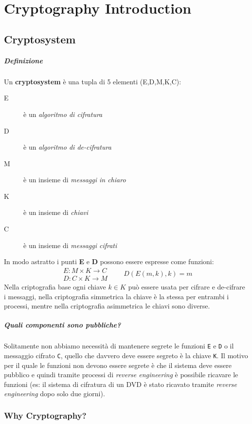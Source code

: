 \chapter{Cryptography Introduction}
\section{Cryptosystem}
    \paragraph{Definizione} Un \textbf{cryptosystem} è una tupla di 5 elementi (E,D,M,K,C):
    \begin{description}
        \item[E] è un \textit{algoritmo di cifratura}
        \item[D] è un \textit{algoritmo di de-cifratura}
        \item[M] è un insieme di \textit{messaggi in chiaro}
        \item[K] è un insieme di \textit{chiavi}
        \item[C] è un insieme di \textit{messaggi cifrati}
    \end{description}
    In modo astratto i punti \textbf{E} e \textbf{D} possono essere espresse come funzioni:
    $$
        \begin{aligned}
            E: M \times K \rightarrow C \\
            D: C \times K \rightarrow M
        \end{aligned}
        \qquad D(E(m,k),k) = m
    $$
    Nella criptografia base ogni chiave $ k \in K $ può essere usata per cifrare e de-cifrare i messaggi, nella criptografia simmetrica la chiave è la stessa per entrambi i processi, mentre nella criptografia asimmetrica le chiavi sono diverse.
    \paragraph{Quali componenti sono pubbliche?} Solitamente non abbiamo necessità di mantenere segrete le funzioni \texttt{E} e \texttt{D} o il messaggio cifrato \texttt{C}, quello che davvero deve essere segreto è la chiave \texttt{K}. Il motivo per il quale le funzioni non devono essere segrete è che il sistema deve essere pubblico e quindi tramite processi di \textit{reverse engineering} è possibile ricavare le funzioni (es: il sistema di cifratura di un DVD è stato ricavato tramite \textit{reverse engineering} dopo solo due giorni).
    \subsection{Why Cryptography?}
